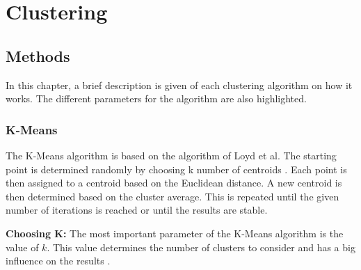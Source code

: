 \section{Clustering}
\subsection{Methods}
In this chapter, a brief description is given of each clustering algorithm on how it works. The different parameters for the algorithm are also highlighted.
\subsubsection{K-Means} \label{theory:kmeans}
The K-Means algorithm is based on the algorithm of Loyd et al.
The starting point is determined randomly by choosing k number of centroids \citep{1056489}.
Each point is then assigned to a centroid based on the Euclidean distance.
A new centroid is then determined based on the cluster average.
This is repeated until the given number of iterations is reached or until the results are stable.

\textbf{Choosing K:} The most important parameter of the K-Means algorithm is the value of $k$.
This value determines the number of clusters to consider and has a big influence on the results \citep{ahmed_k-means_2020-1}.

